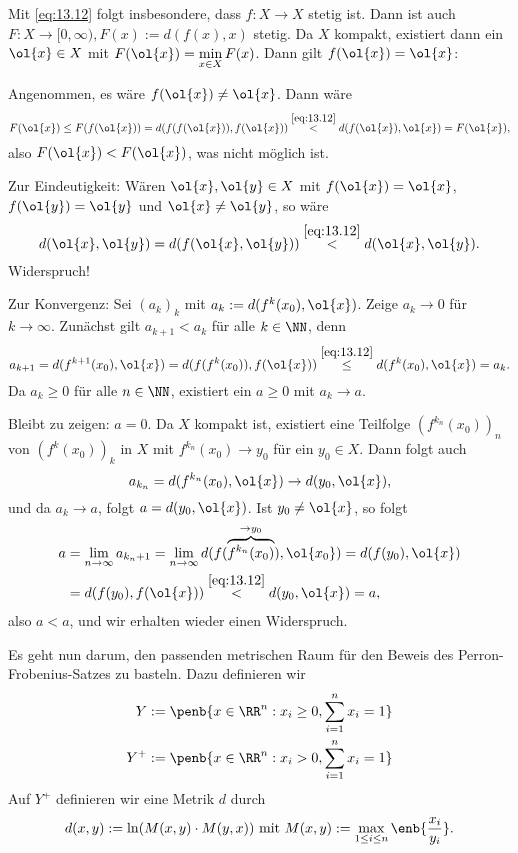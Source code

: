 \begin{beweis}
	Mit \eqref{eq:13.12} folgt insbesondere, dass $f \colon X \rightarrow X$ stetig ist.
	Dann ist auch $F\colon X \rightarrow [0,\infty), F(x) := d(f(x),x)$ stetig.
	Da $X$ kompakt, existiert dann ein $\ol{x} \in X$ mit $F(\ol{x}) = \min\limits_{x \in X} F(x)$.
	Dann gilt $f(\ol{x})= \ol{x}$:
	
	Angenommen, es wäre $f(\ol{x}) \neq \ol{x}$.
	Dann wäre
	\[
		F(\ol{x}) \leq F(f(\ol{x})) = d(f(f(\ol{x})),f(\ol{x})) \stackrel{\eqref{eq:13.12}}{<} d(f(\ol{x}),\ol{x}) = F(\ol{x}),
	\]
	also $F(\ol{x}) < F(\ol{x})$, was nicht möglich ist.
	
	Zur Eindeutigkeit: Wären $\ol{x}, \ol{y} \in X$ mit $f(\ol{x})=\ol{x}$, $f(\ol{y}) = \ol{y}$ und $\ol{x} \neq \ol{y}$, so wäre
	\[
		d(\ol{x},\ol{y}) = d(f(\ol{x},\ol{y})) \stackrel{\eqref{eq:13.12}}{<} d(\ol{x},\ol{y}).
	\]
	Widerspruch!
	
	Zur Konvergenz: Sei $(a_k)_k$ mit $a_k := d(f^k(x_0),\ol{x})$.
	Zeige $a_k \rightarrow 0$ für $k \rightarrow \infty$.
	Zunächst gilt $a_{k+1} < a_k$ für alle $k \in \NN$, denn
	\[
		a_{k+1} = d(f^{k+1}(x_0),\ol{x}) = d(f(f^k(x_0)),f(\ol{x})) \stackrel{\eqref{eq:13.12}}{\leq} d(f^k(x_0),\ol{x}) = a_k.
	\]
	Da $a_k \geq 0$ für alle $n \in \NN$, existiert ein $a \geq 0$ mit $a_k \rightarrow a$.
	
	Bleibt zu zeigen: $a = 0$.
	Da $X$ kompakt ist, existiert eine Teilfolge $(f^{k_n}(x_0))_n$ von $(f^k(x_0))_k$ in $X$ mit $f^{k_n}(x_0) \rightarrow y_0$ für ein $y_0 \in X$.
	Dann folgt auch
	\[
		a_{k_n} = d(f^{k_n}(x_0),\ol{x}) \rightarrow d(y_0,\ol{x}),
	\]
	und da $a_k \rightarrow a$, folgt $a = d(y_0,\ol{x})$.
	Ist $y_0 \neq \ol{x}$, so folgt
	\begin{align*}
		a &= \lim\limits_{n \rightarrow \infty} a_{k_n+1} = \lim\limits_{n \rightarrow \infty} d(f(\overbrace{f^{k_n}(x_0)}^{\rightarrow y_0}),\ol{x_0}) = d(f(y_0),\ol{x}) \\
		&= d(f(y_0),f(\ol{x})) \stackrel{\eqref{eq:13.12}}{<} d(y_0,\ol{x}) = a,
	\end{align*}
	also $a < a$, und wir erhalten wieder einen Widerspruch. \qedhere
\end{beweis}

Es geht nun darum, den passenden metrischen Raum für den Beweis des Perron-Frobenius-Satzes zu basteln.
Dazu definieren wir
\begin{align*}
	Y &:= \penb{x \in \RR^n : x_i \geq 0, \sum_{i=1}^{n} x_i = 1} \\
	Y^+ &:= \penb{x \in \RR^n : x_i > 0, \sum_{i=1}^{n} x_i = 1}
\end{align*}
Auf $Y^+$ definieren wir eine Metrik $d$ durch
\begin{equation}
	d(x,y) := \ln(M(x,y) \cdot M(y,x)) \text{ mit } M(x,y) := \max_{1 \leq i \leq n} \enb{\frac{x_i}{y_i}}. \label{eq:13.D}
\end{equation}

